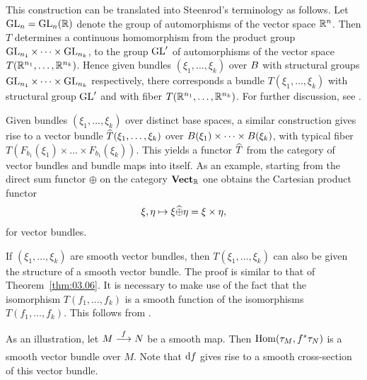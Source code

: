 \documentclass[../main]{subfiles}
\begin{document}
\setcounter{remark}{0}
\begin{remark}\label{rem:03.02}
This construction can be translated into Steenrod's terminology as follows. Let $\operatorname{GL}_n = \operatorname{GL}_n(\mathbb R)$ denote the group of automorphisms of the vector space $\mathbb R^n$. Then $T$ determines a continuous homomorphism from the product group $\operatorname{GL}_{n_1}\times\dots\times\operatorname{GL}_{n_k}$, to the group $\operatorname{GL}'$ of automorphisms of the vector space $T(\mathbb R^{n_{1}}, \dots, \mathbb R^{n_{k}})$. Hence given bundles $(\xi_1,\dots,\xi_k)$ over $B$ with structural groups $\operatorname{GL}_{n_1}\times\dots\times\operatorname{GL}_{n_k}$ respectively, there corresponds a bundle $T(\xi_1,\dots,\xi_k)$ with structural group $\operatorname{GL}'$ and with fiber $T(\mathbb R^{n_{1}}, \dots, \mathbb R^{n_{k}})$. For further discussion, see \cite[$\S$3.6]{hirzebruchalggeo1966}.
\end{remark}


\begin{remark}\label{rem:03.03}
Given bundles $(\xi_1,\dots,\xi_k)$ over distinct base spaces, a similar construction gives rise to a vector bundle $\xhat{T}(\xi_1,\dots,\xi_k)$ over $B(\xi_1)\times\dots\times B(\xi_k)$, with typical fiber $T(F_{b_1}(\xi_1)\times\dots\times F_{b_1}(\xi_k))$. This yields a functor $\xhat{T}$ from the category of vector bundles and bundle maps into itself. As an example, starting from the direct sum functor $\oplus$ on the category $\mathbf{Vect}_{\mathbb{R}}$ one obtains the Cartesian product functor
\[
\xi, \eta \mapsto \xi \xhat{\oplus} \eta=\xi \times \eta,
\]
for vector bundles.
\end{remark}


\begin{remark}\label{rem:03.04}
If $(\xi_1,\dots,\xi_k)$ are smooth vector bundles, then $T(\xi_1,\dots,\xi_k)$ can also be given the structure of a smooth vector bundle. The proof is similar to that of Theorem~\ref{thm:03.06}. It is necessary to make use of the fact that the isomorphism $T(f_1,\dots,f_k)$ is a smooth function of the isomorphisms $T(f_1,\dots,f_k)$.
This follows from \cite[p. 128]{chevalley1999}.
\end{remark}


As an illustration, let $M \varrightarrow{f} N$ be a smooth map. Then $\operatorname{Hom}(\tau_{M},f^*\tau_{N})$ is a smooth vector bundle over $M$. Note that $\mathrm{d} f_{}$ gives rise to a smooth cross-section of this vector bundle.
\end{document}
